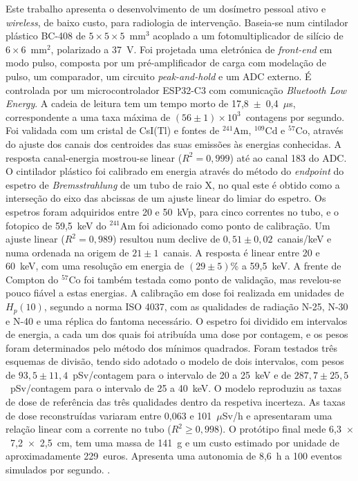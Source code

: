 \documentclass[11pt,twoside,a4paper]{report}
\begin{document}
  {Este trabalho apresenta o desenvolvimento de um dosímetro pessoal ativo e \textsl{wireless}, de baixo custo, para radiologia de intervenção. Baseia-se num cintilador plástico BC-408 de $5 \times 5 \times 5$~mm$^3$ acoplado a um fotomultiplicador de silício de $6 \times 6$~mm$^2$, polarizado a 37~V. Foi projetada uma eletrónica de \textit{front-end} em modo pulso, composta por um pré-amplificador de carga com modelação de pulso, um comparador, um circuito \textit{peak-and-hold} e um ADC externo. É controlada por um microcontrolador ESP32-C3 com comunicação \textit{Bluetooth Low Energy}. A cadeia de leitura tem um tempo morto de 17,8~$\pm$~0,4~$\mu$s, correspondente a uma taxa máxima de $(56 \pm 1)\times10^{3}$~contagens por segundo. Foi validada com um cristal de CsI(Tl) e fontes de $^{241}$Am, $^{109}$Cd e $^{57}$Co, através do ajuste dos canais dos centroides das suas emissões às energias conhecidas. A resposta canal-energia mostrou-se linear ($R^2 = 0{,}999$) até ao canal 183 do ADC.
O cintilador plástico foi calibrado em energia através do método do \textit{endpoint} do espetro de \emph{Bremsstrahlung} de um tubo de raio X, no qual este é obtido como a interseção do eixo das abcissas de um ajuste linear do limiar do espetro. Os espetros foram adquiridos entre 20 e 50~kVp, para cinco correntes no tubo, e o fotopico de 59,5~keV do $^{241}$Am foi adicionado como ponto de calibração. Um ajuste linear ($R^2 = 0{,}989$) resultou num declive de $0{,}51 \pm 0{,}02$~canais/keV e numa ordenada na origem de $21 \pm 1$~canais. A resposta é linear entre 20 e 60~keV, com uma resolução em energia de $(29 \pm 5)$\% a 59,5~keV. A frente de Compton do $^{57}$Co foi também testada como ponto de validação, mas revelou-se pouco fiável a estas energias. A calibração em dose foi realizada em unidades de $H_p(10)$, segundo a norma ISO 4037, com as qualidades de radiação N-25, N-30 e N-40 e uma réplica do fantoma necessário. O espetro foi dividido em intervalos de energia, a cada um dos quais foi atribuída uma dose por contagem, e os pesos foram determinados pelo método dos mínimos quadrados. Foram testados três esquemas de divisão, tendo sido adotado o modelo de dois intervalos, com pesos de $93{,}5 \pm 11{,}4$~pSv/contagem para o intervalo de 20 a 25~keV e de $287{,}7 \pm 25{,}5$~pSv/contagem para o intervalo de 25 a 40~keV. O modelo reproduziu as taxas de dose de referência das três qualidades dentro da respetiva incerteza. As taxas de dose reconstruídas variaram entre 0,063 e 101~$\mu$Sv/h e apresentaram uma relação linear com a corrente no tubo ($R^2 \geq 0{,}998$).
O protótipo final mede 6,3~$\times$~7,2~$\times$~2,5~cm, tem uma massa de 141~g e um custo estimado por unidade de aproximadamente 229~euros. Apresenta uma autonomia de 8,6~h a 100 eventos simulados por segundo.}
       {\hspace{5mm}.}
\EndTitlePage
\end{document}

